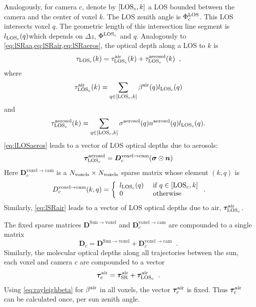 \documentclass[10pt,letterpaper]{article}
\newcommand{\vect}[1]{\bm{#1}}
\begin{document}
Analogously, for camera $c$, denote by $[{\rm LOS}_c,k]$ a LOS bounded
between the camera and the center of voxel $k$. The LOS zenith angle
is $\Phi^{\rm LOS}_c$.  This LOS intersects voxel $q$. The geometric
length of this intersection line segment is $l_{\rm LOS_c}(q)$which
depends on $\Delta z$, $\Phi^{{\rm LOS}_c}$ and $q$.  Analogously to
\cref{eq:lSRaa,eq:lSRair,eq:lSRaeros}, the optical depth along a LOS
to $k$ is
\begin{equation}
  \tau_{{\rm LOS}_c}(k)=
  \tau_{{\rm LOS}_c}^{\rm air}(k) +  \tau_{{\rm LOS}_c}^{\rm aerosol}(k)
  \;\;,
  \label{eq:lLOSaerot}
\end{equation}
where
\begin{equation}
  \tau_{{\rm LOS}_c}^{\rm air}(k)=
  \sum_{q \in[{\rm LOS}_c,k]}
  \beta^{\rm air}(q)  l_{\rm LOS_c}(q)
  \label{eq:lLOSair}
\end{equation}
and
\begin{align}
  \label{eq:lLOSaeros}
  \tau_{{\rm LOS}_c}^{\rm aerosol}(k) = \sum_{q \in[{\rm LOS}_c,k]}
  \sigma^{\rm aerosol}(q) n^{\rm aerosol}(q) l_{\rm LOS_c}(q).
\end{align}
\cref{eq:lLOSaeros} leads to a vector of LOS optical depths due to
aerosols:
\begin{equation}
  \vect{\tau}_{{\rm LOS}_c}^{\rm aerosol}=
  {\bm D}^{\mathrm{voxel \rightarrow cam}}_c
  (\vect{\sigma} \odot {\bm n})
  \label{eq:tauLOSvec1}
\end{equation}
Here ${\bm D}^{\mathrm{voxel \rightarrow cam}}_c$ is a $N_{\rm
  voxels}\times N_{\rm voxels}$ sparse matrix whose element $(k,q)$ is
\begin{equation}
  D^{\mathrm{voxel \rightarrow cam}}_c(k,q) =
  \left\{
    \begin{array}{ll}
      l_{\rm LOS_c}(q) & \mbox{ if $q \in[{\rm LOS}_c,k]$} \\
      0  & \mbox{ otherwise}
      \label{eq:Dvc}
    \end{array}
  \right.
  .
  \hspace{-0.05cm}
\end{equation}
Similarly, \cref{eq:lSRair} leads to a vector of LOS optical depths
due to air, $\vect{\tau}_{{\rm LOS}_c}^{\rm air}$.

The fixed sparse matrices ${\bm D}^{\mathrm{Sun \rightarrow voxel}}$
and ${\bm D}^{\mathrm{voxel \rightarrow cam}}_c$ are compounded to a
single matrix
\begin{equation}
  {\bm D}_c=
  {\bm D}^{\mathrm{Sun \rightarrow voxel}}+
  {\bm D}^{\mathrm{voxel \rightarrow cam}}_c
  \;\;.
  \label{eq:Dtotal}
\end{equation}
Similarly, the molecular optical depths along all trajectories between
the sun, each voxel and camera $c$ are compounded to a vector
\begin{equation}
  \vect{\tau}_c^{\rm air}=
  \vect{\tau}_{\rm SR}^{\rm air}+
  \vect{\tau}_{{\rm LOS}_c}^{\rm air}
  \;\;.
  \label{eq:tauairtotal}
\end{equation}
Using \cref{eq:rayleighbeta} for $\beta^{\rm air}$ in all voxels, the
vector $\vect{\tau}_c^{\rm air}$ is fixed. Thus $\vect{\tau}_c^{\rm
  air}$ can be calculated once, per sun zenith angle.
\end{document}

